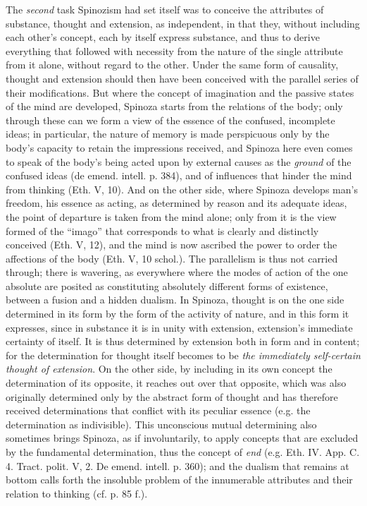 \documentclass[12pt,a4paper,openany]{book}
\newcommand{\opage}[1]{\marginnote{\footnotesize\textit{[#1]}}}
\begin{document}
The \emph{second} task Spinozism had set itself
was to conceive the attributes of substance, thought and
\opage{178}extension, as independent, in that they, without including each other's
concept, each by itself express substance, and thus to
derive everything that followed with necessity from the nature of the single
attribute from it alone, without regard to the other.
Under the same form of causality, thought and
extension should then have been conceived with the parallel series
of their modifications. But where the concept of imagination
and the passive states of the mind are developed, Spinoza starts
from the relations of the body; only through these can we form
a view of the essence of the confused, incomplete ideas;
in particular, the nature of memory is made perspicuous only by
the body's capacity to retain the impressions received, and Spinoza
here even comes to speak of the body's being acted upon
by external causes as the \emph{ground} of the confused ideas
(de emend. intell. p. 384), and of influences that hinder
the mind from thinking (Eth. V, 10). And on the other side,
where Spinoza develops man's freedom, his essence as
acting, as determined by reason and its adequate
ideas, the point of departure is taken from the mind alone; only from
it is the view formed of the ``imago'' that corresponds
to what is clearly and distinctly conceived (Eth. V, 12), and the mind
is now ascribed the power to order the affections of the body
(Eth. V, 10 schol.). The parallelism is thus not carried through;
there is wavering, as everywhere where the modes of action of the one absolute
are posited as constituting absolutely different
forms of existence, between a fusion and a hidden
dualism. In Spinoza, thought is on the one side determined in its
form by the form of the activity of nature, and in this
form it expresses, since in substance it is in unity with
extension, extension's immediate certainty of itself.
It is thus determined by extension both in form and in content;
for the determination for thought itself becomes to
be \emph{the immediately self-certain thought of extension}.
On the other side, by including in its
own concept the determination of its opposite, it reaches out
over that opposite, which was also originally determined only by the
abstract form of thought and has therefore received determinations
\opage{179}\setcounter{footnote}{0}that conflict with its peculiar essence (e.g. the determination
as indivisible). This unconscious mutual determining
also sometimes brings Spinoza, as if involuntarily,
to apply concepts that are excluded by the fundamental determination,
thus the concept of \emph{end} (e.g. Eth. IV.
App. C. 4. Tract. polit. V, 2. De emend. intell. p. 360);
and the dualism that remains at bottom calls forth
the insoluble problem of the innumerable attributes and their
relation to thinking (cf. p. 85 f.).
\end{document}
